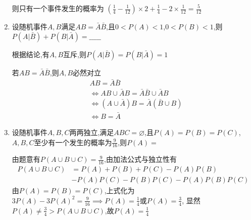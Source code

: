 \documentclass[12pt, a4paper, oneside, UTF8]{ctexbook}
\begin{document}
\begin{enumerate}[label=\arabic*.]
\begin{solution}
\begin{center}
    \end{center}
    则只有一个事件发生的概率为
        $(\frac{1}{4} - \frac{1}{12})\times 2 + \frac{1}{4} 
        - 2\times \frac{1}{12} = \frac{5}{12}$
    \end{solution}
    
    \item 设随机事件$A,B$满足$AB=\bar{A}\bar{B}$,且$0<P(A)<1$,$0<P(B)<1$,则$P(A|\bar{B})+P(B|\bar{A})=\_\_\_\_\_$
    
    \begin{solution}
    \color{blue}
    根据结论,有$A,B$互斥,则$P(A|\bar{B})=P(B|\bar{A})=1$
    \end{solution}

    \begin{corollary}
        若$AB=\bar{A}\bar{B}$,则$A,B$必然对立
        \begin{align*}
            &AB =\bar{A}\bar{B} \\
            &\iff AB\cup \bar{A}B =\bar{A}\bar{B}\cup \bar{A}B \\
            &\iff (A\cup \bar{A})B = \bar{A}(\bar{B}\cup B) \\
            &\iff B = \bar{A}
        \end{align*}
    \end{corollary}

    \item 设随机事件$A,B,C$两两独立,满足$ABC=\varnothing$,且$P(A)=P(B)=P(C)$,$A,B,C$至少有一个发生的概率为$\frac{9}{16}$,则$P(A)=$
    
    \begin{solution}
    \color{blue}
    由题意有$P(A\cup B\cup C) = \frac{9}{16}$,由加法公式与独立性有
    \begin{align*}
        P(A\cup B\cup C) 
        &= P(A) + P(B) + P(C) - P(A)P(B) \\
        &- P(A)P(C) - P(B)P(C) - P(A)P(B)P(C)
    \end{align*}
    由$P(A)=P(B)=P(C)$,上式化为$3P(A)-3P(A)^2 = \frac{9}{16}\implies P(A)=\frac{1}{4}\text{或}P(A)=\frac{3}{4}$,
    显然$P(A)\neq \frac{3}{4} > P(A\cup B\cup C)$,故$P(A)=\frac{1}{4}$
    \end{solution}
    

\end{enumerate}
\end{document}
